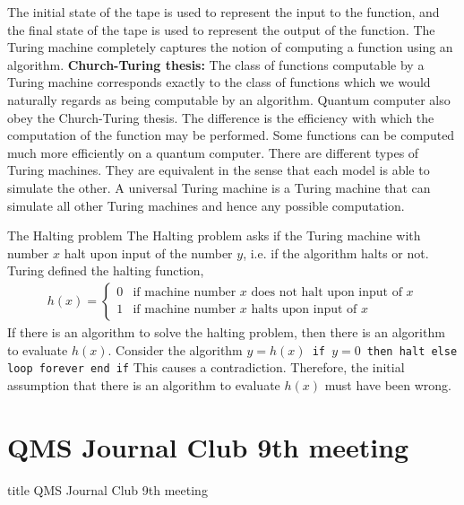 \documentclass{beamer}
\begin{document}
\begin{frame}
\justify
The initial state of the tape is used to represent the input to the function, and the final state of the tape is used to represent the output of the function.
\vfill
The Turing machine completely captures the notion of computing a function using an algorithm.
\vfill
\textbf{Church-Turing thesis:} The class of functions computable by a Turing machine corresponds exactly to the class of functions which we would naturally regards as being computable by an algorithm.
\vfill
Quantum computer also obey the Church-Turing thesis. The difference is the efficiency with which the computation of the function may be performed. Some functions can be computed much more efficiently on a quantum computer.
\vfill
There are different types of Turing machines. They are equivalent in the sense that each model is able to simulate the other. A universal Turing machine is a Turing machine that can simulate all other Turing machines and hence any possible computation.
\end{frame}

\begin{frame}{The Halting problem}
\justify
The Halting problem asks if the Turing machine with number $x$ halt upon input of the number $y$, i.e. if the algorithm halts or not.
\vfill
Turing defined the halting function,
\begin{align}
h(x) = \begin{cases}
0 & \text{if machine number $x$ does not halt upon input of $x$} \\
1 & \text{if machine number $x$ halts upon input of $x$}
\end{cases}
\end{align}
\vfill
If there is an algorithm to solve the halting problem, then there is an algorithm to evaluate $h(x)$. Consider the algorithm\newline
\texttt{$y=h(x)$\newline
if $y=0$ then halt\newline
else loop forever\newline
end if}
\vfill
This causes a contradiction. Therefore, the initial assumption that there is an algorithm to evaluate $h(x)$ must have been wrong.
\end{frame}

\section{QMS Journal Club 9th meeting}
\begin{frame}
\vfill
\centering
\begin{beamercolorbox}[sep=8pt,center,shadow=true,rounded=true]{title}
\Large QMS Journal Club 9th meeting
\end{beamercolorbox}
\vfill
\end{frame}
\end{document}
